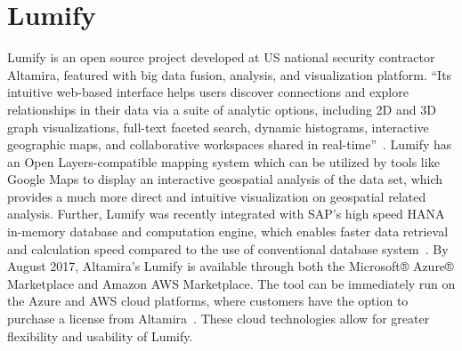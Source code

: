 \section{Lumify}
Lumify is an open source project developed at US national security contractor Altamira, featured with 
big data fusion, analysis, and visualization platform. ``Its intuitive web-based interface helps users 
discover connections and explore relationships in their data via a suite of analytic options, including 2D 
and 3D graph visualizations, full-text faceted search, dynamic histograms, interactive geographic 
maps, and collaborative workspaces shared in real-time''~\cite{hid-sp18-405-www-lumify}. Lumify has 
an Open Layers-compatible mapping system which can be utilized by tools like Google Maps to display 
an interactive geospatial analysis of the data set, which provides a much more direct and intuitive 
visualization on geospatial related analysis. Further, Lumify was recently integrated with SAP's high 
speed HANA in-memory database and computation engine, which enables faster data retrieval and 
calculation speed compared to the use of conventional database 
system~\cite{hid-sp18-405-linkedinblog-lumify}. By August 2017, Altamira’s Lumify is available through 
both the Microsoft® Azure® Marketplace and Amazon AWS Marketplace. The tool can be immediately 
run on the Azure and AWS cloud platforms, where customers have the option to purchase a license 
from Altamira~\cite{hid-sp18-405-wwwaws-lumify}\cite{hid-sp18-405-wwwazure-lumify}. These cloud 
technologies allow for greater 
flexibility and usability of Lumify. 